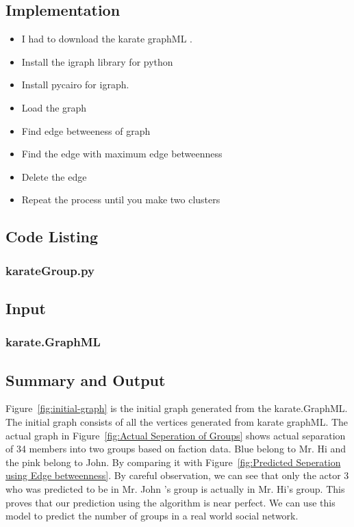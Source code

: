 \documentclass[12pt]{article}
\begin{document}
\subsection{Implementation}
\begin{itemize}  
\item I had to download the karate graphML .
\item Install the igraph library for python
\item Install pycairo for igraph. 
\item Load the graph
\item Find edge betweeness of graph 
\item Find the edge with maximum edge betweenness
\item Delete the edge
\item Repeat the process until you make two clusters
 
\end{itemize}
 \newpage

\subsection{Code Listing}
\subsubsection{karateGroup.py}

\newpage

\subsection{Input}
\subsubsection{karate.GraphML}


\newpage


\subsection{Summary and Output}
Figure~\ref{fig:initial-graph} is the initial graph generated from the karate.GraphML. The initial graph consists of all the vertices generated from karate graphML. The actual graph in Figure~\ref{fig:Actual Seperation of Groups} shows actual  separation of 34 members into two groups based on faction data. Blue belong to Mr. Hi and the pink belong to John. By comparing it with Figure~\ref{fig:Predicted Seperation using Edge betweenness}. By careful observation, we can see that only the actor 3 who was predicted to be in Mr. John ’s group is actually in Mr. Hi's group. This proves that our prediction using the algorithm is near perfect. We can use this model to predict the number of groups in a real world social network. 
\end{document}
